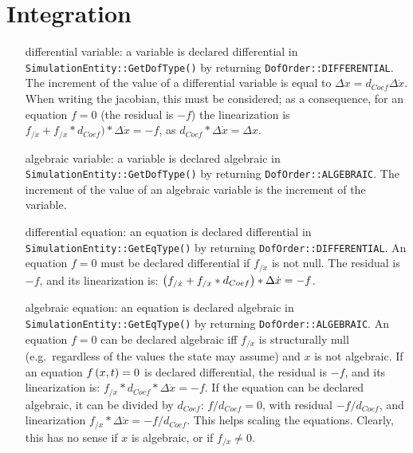 \documentclass[10pt,dvips]{report}
\begin{document}
\chapter{Integration}

\begin{itemize}

\item[differential variable:] a variable is declared differential
in \texttt{SimulationEntity::GetDofType()} 
by returning \texttt{DofOrder::DIFFERENTIAL}.
The increment of the value of a differential variable is equal 
to $\Delta x=d_{Coef}\Delta \dot{x}$.
When writing the jacobian, this must be considered;
as a consequence, for an equation $f=0$ (the residual is $-f$)
the linearization is 
$f_{/\dot{x}}+f_{/x}*d_{Coef})*\Delta \dot{x}=-f$, 
as $d_{Coef}*\Delta \dot{x}=\Delta x$.

\item[algebraic variable:] a variable is declared algebraic
in \texttt{SimulationEntity::GetDofType()}
by returning \texttt{DofOrder::ALGEBRAIC}.
The increment of the value of an algebraic variable is the increment 
of the variable.

\item[differential equation:] an equation is declared differential
in \texttt{SimulationEntity::GetEqType()}
by returning \texttt{DofOrder::DIFFERENTIAL}.
An equation $f=0$ must be declared differential if $f_{/\dot{x}}$ is not null.
The residual is $-f$, and its linearization is:
$\left( f_{/\dot{x}}+f_{/x}*d_{Coef} \right)*\Delta \dot{x}=-f$.

\item[algebraic equation:] an equation is declared algebraic
in \texttt{SimulationEntity::GetEqType()}
by returning \texttt{DofOrder::ALGEBRAIC}.
An equation $f=0$ can be declared algebraic iff $f_{/\dot{x}}$ 
is structurally null (e.g.\ regardless of the values the state may assume) 
and $x$ is not algebraic.
If an equation $f\left( x,t \right)=0$ is declared differential,
the residual is $-f$, and its linearization is:
$f_{/x}*d_{Coef}*\Delta \dot{x}=-f$.
If the equation can be declared algebraic, it can be divided by $d_{Coef}$:
$f/d_{Coef}=0$, with residual $-f/d_{Coef}$,
and linearization $f_{/x}*\Delta \dot{x} = -f/d_{Coef}$.
This helps scaling the equations.
Clearly, this has no sense if $x$ is algebraic,
or if $f_{/\dot{x}} \neq 0$.

\end{itemize}
\end{document}
